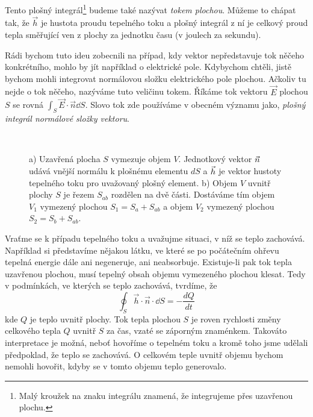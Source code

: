     Tento plošný integrál\footnote{Malý kroužek na znaku integrálu znamená, že integrujeme přes 
    uzavřenou plochu.} budeme také nazývat \emph{tokem plochou}. Můžeme to chápat tak, že $\vec{h}$ 
    je hustota proudu tepelného toku a plošný integrál z ní je celkový proud tepla směřující ven z 
    plochy za jednotku času (v joulech za sekundu).
    
    Rádi bychom tuto ideu zobecnili na případ, kdy vektor nepředstavuje tok něčeho konkrétního, 
    mohlo by jít například o elektrické pole. Kdybychom chtěli, jistě bychom mohli integrovat 
    normálovou složku elektrického pole plochou. Ačkoliv tu nejde o tok něčeho, nazýváme tuto 
    veličinu tokem. Říkáme tok vektoru $\vec{E}$ plochou \(S\) se rovná 
    \(\int_S\vec{E}\cdot\vec{n}\dd{S}\). Slovo tok zde používáme v obecném významu jako, 
    \emph{plošný integrál normálové složky vektoru}.  
    
    \begin{figure}[ht!]
      \centering
          \\ 
      \caption{a) Uzavřená plocha $S$ vymezuje objem $V$. Jednotkový vektor $\protect\vec{n}$ udává
              vnější normálu k plošnému elementu $dS$ a $\protect\vec{h}$ je vektor hustoty
              tepelného toku pro uvažovaný plošný element. b) Objem $V$ uvnitř plochy $S$ je řezem
              $S_{ab}$ rozdělen na dvě části. Dostáváme tím objem $V_1$ vymezený plochou
              $S_1=S_a+S_{ab}$ a objem $V_2$ vymezený plochou $S_2=S_b+S_{ab}$.
              \cite[s.~48]{Feynman02}}
    \end{figure}
    
    Vraťme se k případu tepelného toku a uvažujme situaci, v níž se teplo zachovává. Například si
    představíme nějakou látku, ve které se po počátečním ohřevu tepelná energie dále ani 
    negeneruje, ani neabsorbuje. Existuje-li pak tok tepla uzavřenou plochou, musí tepelný obsah 
    objemu vymezeného plochou klesat. Tedy v podmínkách, ve kterých se teplo zachovává, tvrdíme, že
    \begin{equation}\label{fyz:eq_int_fey_dQ}
      \oint_S\vec{h}\cdot\vec{n}\cdot\dd{S} = - \frac{dQ}{dt}
    \end{equation}
    kde $Q$ je teplo uvnitř plochy. Tok tepla plochou $S$ je roven rychlosti změny celkového tepla 
    $Q$ uvnitř $S$ za čas, vzaté se záporným znaménkem. Takováto interpretace je možná, neboť 
    hovoříme o tepelném toku a kromě toho jsme udělali předpoklad, že teplo se zachovává. O 
    celkovém teple uvnitř objemu bychom nemohli hovořit, kdyby se v tomto objemu teplo generovalo.
    
